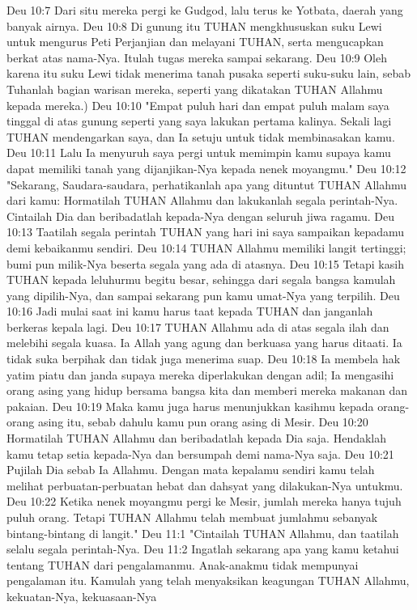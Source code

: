 Deu 10:7  Dari situ mereka pergi ke Gudgod, lalu terus ke Yotbata, daerah yang banyak airnya.
Deu 10:8  Di gunung itu TUHAN mengkhususkan suku Lewi untuk mengurus Peti Perjanjian dan melayani TUHAN, serta mengucapkan berkat atas nama-Nya. Itulah tugas mereka sampai sekarang.
Deu 10:9  Oleh karena itu suku Lewi tidak menerima tanah pusaka seperti suku-suku lain, sebab Tuhanlah bagian warisan mereka, seperti yang dikatakan TUHAN Allahmu kepada mereka.)
Deu 10:10  "Empat puluh hari dan empat puluh malam saya tinggal di atas gunung seperti yang saya lakukan pertama kalinya. Sekali lagi TUHAN mendengarkan saya, dan Ia setuju untuk tidak membinasakan kamu.
Deu 10:11  Lalu Ia menyuruh saya pergi untuk memimpin kamu supaya kamu dapat memiliki tanah yang dijanjikan-Nya kepada nenek moyangmu."
Deu 10:12  "Sekarang, Saudara-saudara, perhatikanlah apa yang dituntut TUHAN Allahmu dari kamu: Hormatilah TUHAN Allahmu dan lakukanlah segala perintah-Nya. Cintailah Dia dan beribadatlah kepada-Nya dengan seluruh jiwa ragamu.
Deu 10:13  Taatilah segala perintah TUHAN yang hari ini saya sampaikan kepadamu demi kebaikanmu sendiri.
Deu 10:14  TUHAN Allahmu memiliki langit tertinggi; bumi pun milik-Nya beserta segala yang ada di atasnya.
Deu 10:15  Tetapi kasih TUHAN kepada leluhurmu begitu besar, sehingga dari segala bangsa kamulah yang dipilih-Nya, dan sampai sekarang pun kamu umat-Nya yang terpilih.
Deu 10:16  Jadi mulai saat ini kamu harus taat kepada TUHAN dan janganlah berkeras kepala lagi.
Deu 10:17  TUHAN Allahmu ada di atas segala ilah dan melebihi segala kuasa. Ia Allah yang agung dan berkuasa yang harus ditaati. Ia tidak suka berpihak dan tidak juga menerima suap.
Deu 10:18  Ia membela hak yatim piatu dan janda supaya mereka diperlakukan dengan adil; Ia mengasihi orang asing yang hidup bersama bangsa kita dan memberi mereka makanan dan pakaian.
Deu 10:19  Maka kamu juga harus menunjukkan kasihmu kepada orang-orang asing itu, sebab dahulu kamu pun orang asing di Mesir.
Deu 10:20  Hormatilah TUHAN Allahmu dan beribadatlah kepada Dia saja. Hendaklah kamu tetap setia kepada-Nya dan bersumpah demi nama-Nya saja.
Deu 10:21  Pujilah Dia sebab Ia Allahmu. Dengan mata kepalamu sendiri kamu telah melihat perbuatan-perbuatan hebat dan dahsyat yang dilakukan-Nya untukmu.
Deu 10:22  Ketika nenek moyangmu pergi ke Mesir, jumlah mereka hanya tujuh puluh orang. Tetapi TUHAN Allahmu telah membuat jumlahmu sebanyak bintang-bintang di langit."
Deu 11:1  "Cintailah TUHAN Allahmu, dan taatilah selalu segala perintah-Nya.
Deu 11:2  Ingatlah sekarang apa yang kamu ketahui tentang TUHAN dari pengalamanmu. Anak-anakmu tidak mempunyai pengalaman itu. Kamulah yang telah menyaksikan keagungan TUHAN Allahmu, kekuatan-Nya, kekuasaan-Nya
